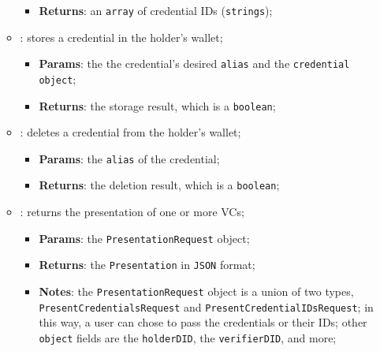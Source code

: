 \begin{itemize}
\begin{itemize}
\begin{itemize}
            \item \textbf{Returns}: an \texttt{array} of credential IDs (\texttt{strings});
        \end{itemize}
        \item[] : stores a credential in the holder's wallet;
        \begin{itemize}
            \item \textbf{Params}: the the credential's desired \texttt{alias} and the
            \texttt{credential object};
            \item \textbf{Returns}: the storage result, which is a \texttt{boolean};
        \end{itemize}
        \item[] : deletes a credential from the holder's wallet;
        \begin{itemize}
            \item \textbf{Params}: the \texttt{alias} of the credential;
            \item \textbf{Returns}: the deletion result, which is a \texttt{boolean};
        \end{itemize}
        \item[] : returns the presentation of one or more VCs;
        \begin{itemize}
            \item \textbf{Params}: the \texttt{PresentationRequest} object;
            \item \textbf{Returns}: the \texttt{Presentation} in \texttt{JSON} format;
            \item \textbf{Notes}: the \texttt{PresentationRequest} object is a union of two
            types, \texttt{PresentCredentialsRequest} and \texttt{PresentCredentialIDsRequest};
            in this way, a user can chose to pass the credentials or their IDs; other \texttt{object}
            fields are the \texttt{holderDID}, the \texttt{verifierDID}, and more;
        \end{itemize}
    \end{itemize}


\end{itemize}
